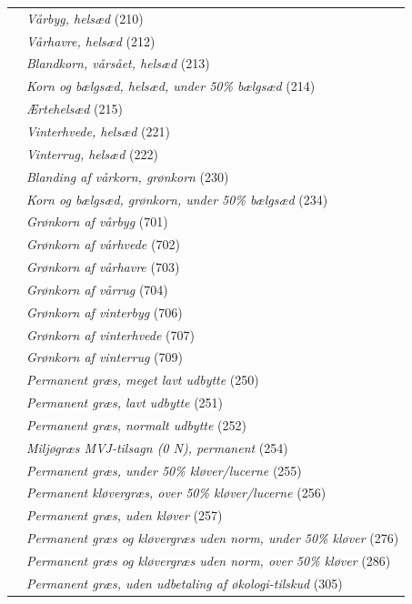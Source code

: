 \documentclass[12pt]{article}
\begin{document}
\begin{longtable}{l | p{9cm}}
       & \textit{Vårbyg, helsæd} (210) \\
       & \textit{Vårhavre, helsæd} (212) \\
       & \textit{Blandkorn, vårsået, helsæd} (213) \\
       & \textit{Korn og bælgsæd, helsæd, under 50\% bælgsæd} (214) \\
       & \textit{Ærtehelsæd} (215) \\
       & \textit{Vinterhvede, helsæd} (221) \\
       & \textit{Vinterrug, helsæd} (222) \\
       & \textit{Blanding af vårkorn, grønkorn} (230) \\
       & \textit{Korn og bælgsæd, grønkorn, under 50\% bælgsæd} (234) \\
       & \textit{Grønkorn af vårbyg} (701) \\
       & \textit{Grønkorn af vårhvede} (702) \\
       & \textit{Grønkorn af vårhavre} (703) \\
       & \textit{Grønkorn af vårrug} (704) \\
       & \textit{Grønkorn af vinterbyg} (706) \\
       & \textit{Grønkorn af vinterhvede} (707) \\
       & \textit{Grønkorn af vinterrug} (709) \\

       & \textit{Permanent græs, meget lavt udbytte} (250) \\
       & \textit{Permanent græs, lavt udbytte} (251) \\
       & \textit{Permanent græs, normalt udbytte} (252) \\
       & \textit{Miljøgræs MVJ-tilsagn (0 N), permanent} (254) \\
       & \textit{Permanent græs, under 50\% kløver/lucerne} (255) \\
       & \textit{Permanent kløvergræs, over 50\% kløver/lucerne} (256) \\
       & \textit{Permanent græs, uden kløver} (257) \\
       & \textit{Permanent græs og kløvergræs uden norm, under 50\% kløver} (276) \\
       & \textit{Permanent græs og kløvergræs uden norm, over 50\% kløver} (286) \\
       & \textit{Permanent græs, uden udbetaling af økologi-tilskud} (305) \\ \midrule
 

\end{longtable}
\end{document}
